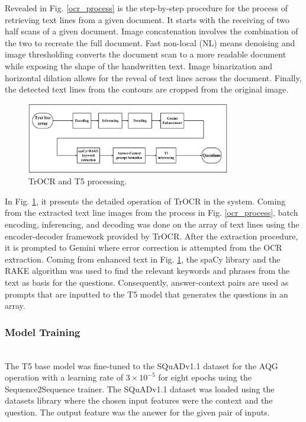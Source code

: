 \documentclass[conference]{IEEEtran}
\begin{document}
\indent Revealed in Fig. \ref{ocr_process} is the step-by-step 
procedure for the process of retrieving text lines from 
a given document. It starts with the receiving of two half 
scans of a given document. Image concatenation involves 
the combination of the two to recreate the full document. 
Fast non-local (NL) means denoising and image thresholding 
converts the document scan to a more readable document while 
exposing the shape of the handwritten text. Image binarization 
and horizontal dilation allows for the reveal of text 
lines across the document. Finally, the detected text lines from the contours are cropped 
from the original image.
\hfill
\begin{figure}[H]
\centerline{\includegraphics[width=3.5in]{trocr_process.png}}
\vspace{-0.4cm}
\caption{TrOCR and T5 processing.} 
\label{trocr_process}
\end{figure}
\indent In Fig. \ref{trocr_process}, it presents the detailed operation 
of TrOCR in the system. Coming from the extracted text line images 
from the process in Fig. \ref{ocr_process}, batch encoding, inferencing, and 
decoding was done on the array of text lines using the encoder-decoder 
framework provided by TrOCR. After the extraction procedure, it is 
prompted to Gemini where error correction is attempted from the 
OCR extraction. Coming from enhanced text in Fig. \ref{trocr_process}, 
the spaCy library and the RAKE algorithm was used to find the 
relevant keywords and phrases from the text as basis for the questions. 
Consequently, answer-context pairs are used as prompts that are inputted 
to the T5 model that generates the questions in an array. 
\vspace{0.3cm}
\subsubsection{Model Training}
\hfill \\ 
\indent The T5 base model was fine-tuned to the SQuADv1.1 
dataset for the AQG operation with a learning rate of 
$3 \times 10^{-5}$ for eight epochs using the Sequence2Sequence 
trainer. The SQuADv1.1 dataset was loaded using the
datasets library where the chosen input features 
were the context and the question. The output feature 
was the answer for the given pair of inputs.
\end{document}
